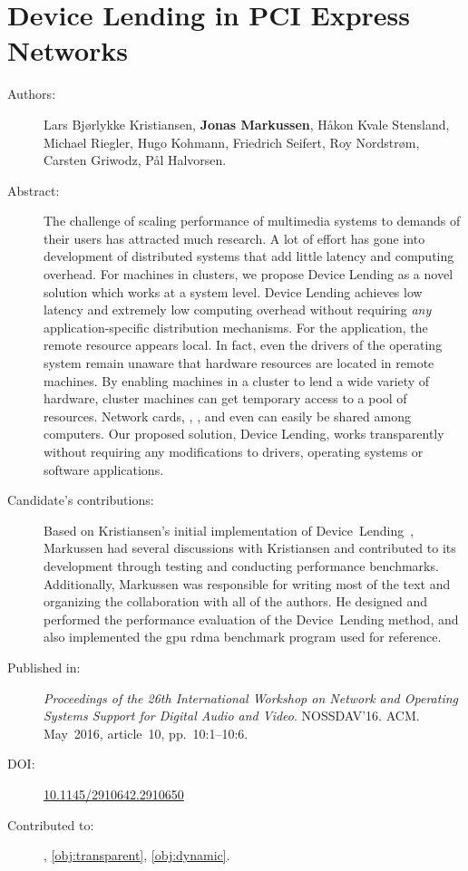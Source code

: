 \chapter{Device Lending in PCI Express Networks}
\label{paper:nossdav}
\paperthumb

\begin{description}
	\item[Authors:]
		Lars Bj{\o}rlykke Kristiansen, \textbf{Jonas Markussen}, H{\aa}kon Kvale Stensland,
		Michael Riegler, Hugo Kohmann, Friedrich Seifert, Roy Nordstr{\o}m, Carsten Griwodz, P{\aa}l Halvorsen.

	\item[Abstract:]
		The challenge of scaling  performance of multimedia systems to demands
		of their users has attracted much research.
		A lot of effort has gone into
		development of distributed systems that add little latency and computing overhead.
		For machines in  clusters,
		we propose Device Lending as a novel solution which works at a system
		level.
		Device Lending achieves low latency and extremely low computing overhead without
		requiring \textit{any} application-specific distribution mechanisms.
		For the application, the remote  resource appears local.
		In fact, even the drivers of the operating system remain unaware that
		hardware resources are located in remote machines.
		By enabling machines in a  cluster to lend a wide variety of hardware, 
		cluster machines can get temporary access to a pool of  resources. 
		Network cards, , , and even  can easily 
		be shared among computers.
		Our proposed solution, Device Lending, works transparently without requiring any modifications to drivers,
		operating systems or software applications.

	\item[Candidate's contributions:]
		Based on Kristiansen's initial implementation of Device~Lending~\cite{Kristiansen2015}, Markussen had several discussions with Kristiansen and contributed to its development through testing and conducting performance benchmarks.
		Additionally, Markussen was responsible for writing most of the text and organizing the collaboration with all of the authors.
		He designed and performed the performance evaluation of the Device~Lending method, and also implemented the \acrshort{gpu} \acrshort{rdma} benchmark program used for reference.
		

	\item[Published in:]
		\emph{Proceedings of the 26th International Workshop on Network and Operating Systems Support for Digital Audio and Video}.
		NOSSDAV'16. ACM.
		May~2016, article~10, pp.~10:1--10:6.

	\item[DOI:] \href{https://doi.org/10.1145/2910642.2910650}{10.1145/2910642.2910650}

	\item[Contributed to:]
		, \cref{obj:transparent}, \cref{obj:dynamic}.

\end{description}

